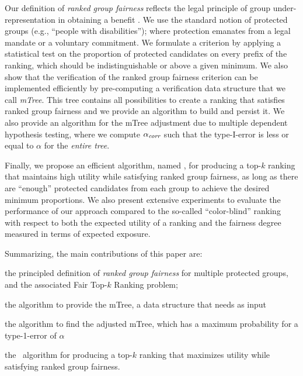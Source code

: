Our definition of \emph{ranked group fairness} reflects the legal principle of group under-representation in obtaining a benefit \cite{ellis2012eu,lerner2003group}.
%
We use the standard notion of protected groups (e.g., ``people with disabilities''); where protection emanates from a legal mandate or a voluntary commitment.
%
%
We formulate a criterion by applying a statistical test on the proportion of protected candidates on every prefix of the ranking, which should be indistinguishable or above a given minimum.
%
%
We also show that the verification of the ranked group fairness criterion can be implemented efficiently by pre-computing a verification data structure that we call \emph{mTree}.
%
This tree contains all possibilities to create a ranking that satisfies ranked group fairness and we provide an algorithm to build and persist it.
%
We also provide an algorithm \algoCorrect for the mTree adjustment due to multiple dependent hypothesis testing, where we compute $\alpha_\textit{corr}$ such that the type-I-error is less or equal to $\alpha$ for the \emph{entire tree}.

Finally, we propose an efficient algorithm, named \algoFAIR, for producing a top-$k$ ranking that maintains high utility while satisfying ranked group fairness, as long as there are ``enough'' protected candidates from each group to achieve the desired minimum proportions.
%
We also present extensive experiments to evaluate the performance of our approach compared to the so-called ``color-blind'' ranking with respect to both the expected utility of a ranking and the fairness degree measured in terms of expected exposure.

Summarizing, the main contributions of this paper are:
\begin{compactenum}
	\item the principled definition of \emph{ranked group fairness} for multiple protected groups, and the associated  {\sc Fair Top-$k$ Ranking problem};
	\item the \algoComputeMTree algorithm to provide the mTree, a data structure that \algoFAIR needs as input
	\item the \algoCorrect algorithm to find the adjusted mTree, which has a maximum probability for a type-1-error of $\alpha$
	\item the \algoFAIR\ algorithm for producing a top-$k$ ranking that maximizes utility while satisfying ranked group fairness.
\end{compactenum}

